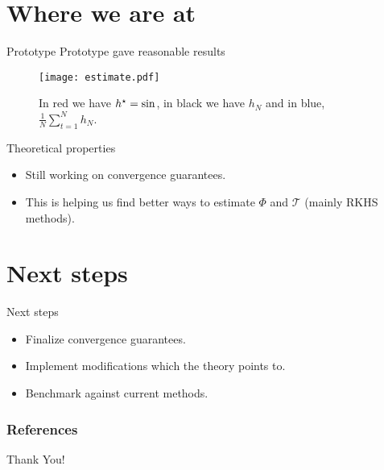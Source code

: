 \documentclass[aspectratio=169]{beamer}
\begin{document}
    \section{Where we are at}

    \begin{frame}{Prototype}
        Prototype gave reasonable results
        \begin{figure}[htb]
            \begin{center}
                \texttt{[image: estimate.pdf]}
                \caption{In red we have $ h^{ \star } = \sin $, in black we have $ h_{ N } $ and in blue, $ \frac{ 1 }{ N } \sum_{ t=1 }^{ N } h_{ N } $.}
                \label{fig: prototype}
            \end{center}
        \end{figure}
    \end{frame}

    \begin{frame}{Theoretical properties}
        \begin{itemize}
            \item<1-> Still working on convergence guarantees.
            \item<2-> This is helping us find better ways to estimate $ \Phi $ and $ \mathcal{T} $ (mainly RKHS methods).
        \end{itemize}
    \end{frame}

    \section{Next steps}

    \begin{frame}{Next steps}
        \begin{itemize}
            \item<1-> Finalize convergence guarantees.
            \item<2-> Implement modifications which the theory points to.
            \item<3-> Benchmark against current methods.
        \end{itemize}
    \end{frame}

    \begin{frame}
        \frametitle{References}
        \nocite{*}
        \printbibliography
    \end{frame}

    \begin{frame}
        \centering Thank You!
    \end{frame}
\end{document}
